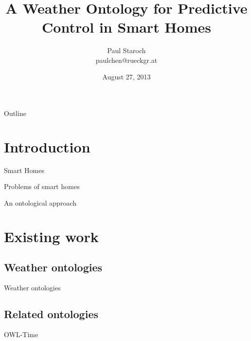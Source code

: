 \documentclass{beamer}
\title %
{A Weather Ontology for Predictive Control in Smart Homes}
\author[Paul Staroch] %
{Paul Staroch\\ paulchen@rueckgr.at} %
\institute[Vienna University of Technology] %
{
  Automation Systems Group\\
  Institute for Computer Aided Automation\\
  Vienna University of Technology\\

  \hspace{5em}

  Supervisors:\\
  Ao.Univ.-Prof. Dipl.-Ing. Dr.techn. Wolfgang Kastner\\
  Dipl.-Ing. Mario Kofler

}
\date %
{August 27, 2013}
\begin{document}
\begin{frame}
  \titlepage
\end{frame}

\begin{frame}{Outline}
  \tableofcontents
\end{frame}




\section{Introduction}

\begin{frame}{Smart Homes}
\end{frame}

\begin{frame}{Problems of smart homes}
\end{frame}

\begin{frame}{An ontological approach}
\end{frame}

\section{Existing work}

\subsection{Weather ontologies}

\begin{frame}{Weather ontologies}
\end{frame}

\subsection{Related ontologies}

\begin{frame}{OWL-Time}
\end{frame}
\end{document}
